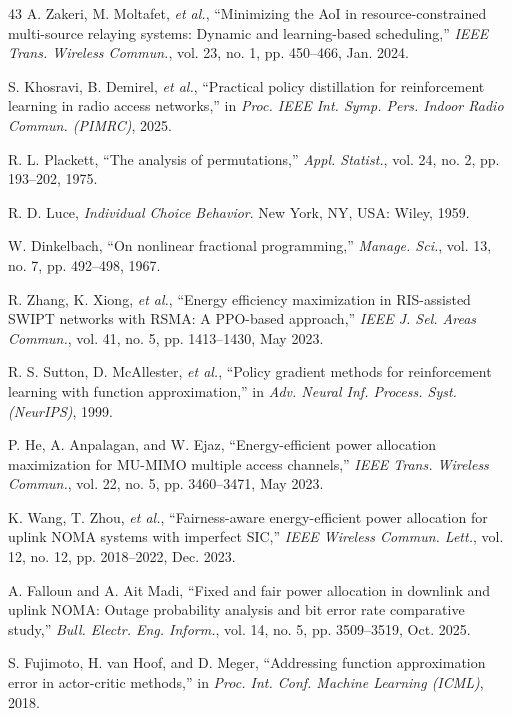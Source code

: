 \documentclass[journal]{IEEEtran}
\begin{document}
\begin{thebibliography}{43}
A. Zakeri, M. Moltafet, \emph{et al.}, ``Minimizing the AoI in resource-constrained multi-source relaying systems: Dynamic and learning-based scheduling,'' \emph{IEEE Trans. Wireless Commun.}, vol. 23, no. 1, pp. 450--466, Jan. 2024.

S. Khosravi, B. Demirel, \emph{et al.}, ``Practical policy distillation for reinforcement learning in radio access networks,'' in \emph{Proc. IEEE Int. Symp. Pers. Indoor Radio Commun. (PIMRC)}, 2025.

R. L. Plackett, ``The analysis of permutations,'' \emph{Appl. Statist.}, vol. 24, no. 2, pp. 193--202, 1975.

R. D. Luce, \emph{Individual Choice Behavior}. New York, NY, USA: Wiley, 1959.

W. Dinkelbach, ``On nonlinear fractional programming,'' \emph{Manage. Sci.}, vol. 13, no. 7, pp. 492--498, 1967.

R. Zhang, K. Xiong, \emph{et al.}, ``Energy efficiency maximization in RIS-assisted SWIPT networks with RSMA: A PPO-based approach,'' \emph{IEEE J. Sel. Areas Commun.}, vol. 41, no. 5, pp. 1413--1430, May 2023.

R. S. Sutton, D. McAllester, \emph{et al.}, ``Policy gradient methods for reinforcement learning with function approximation,'' in \emph{Adv. Neural Inf. Process. Syst. (NeurIPS)}, 1999.

P. He, A. Anpalagan, and W. Ejaz, ``Energy-efficient power allocation maximization for MU-MIMO multiple access channels,'' \emph{IEEE Trans. Wireless Commun.}, vol. 22, no. 5, pp. 3460--3471, May 2023.

K. Wang, T. Zhou, \emph{et al.}, ``Fairness-aware energy-efficient power allocation for uplink NOMA systems with imperfect SIC,'' \emph{IEEE Wireless Commun. Lett.}, vol. 12, no. 12, pp. 2018--2022, Dec. 2023.

A. Falloun and A. Ait Madi, ``Fixed and fair power allocation in downlink and uplink NOMA: Outage probability analysis and bit error rate comparative study,'' \emph{Bull. Electr. Eng. Inform.}, vol. 14, no. 5, pp. 3509--3519, Oct. 2025.

S. Fujimoto, H. van Hoof, and D. Meger, ``Addressing function approximation error in actor-critic methods,'' in \emph{Proc. Int. Conf. Machine Learning (ICML)}, 2018.


\end{thebibliography}
\end{document}
